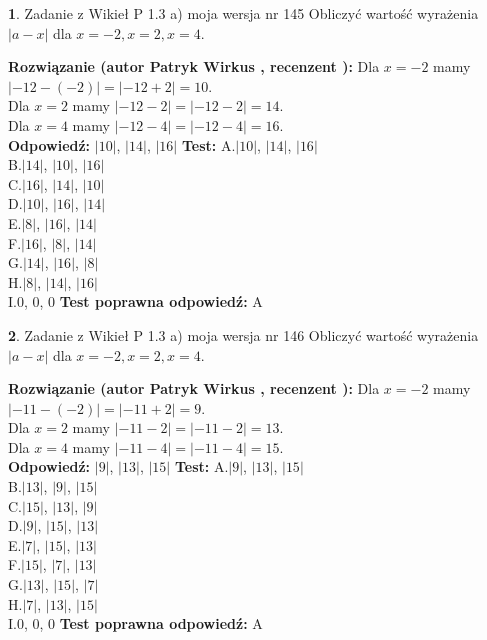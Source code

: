 \documentclass[12pt, a4paper]{article}
\theoremstyle{definition} %
\newtheorem{zad}{}
\newcommand{\zadStart}[1]{\begin{zad}#1\newline}
\newcommand{\zadStop}{\end{zad}}
\newcommand{\rozwStart}[2]{\noindent \textbf{Rozwiązanie (autor #1 , recenzent #2): }\newline}
\newcommand{\rozwStop}{\newline}
\newcommand{\odpStart}{\noindent \textbf{Odpowiedź:}\newline}
\newcommand{\odpStop}{\newline}
\newcommand{\testStart}{\noindent \textbf{Test:}\newline}
\newcommand{\testStop}{\newline}
\newcommand{\kluczStart}{\noindent \textbf{Test poprawna odpowiedź:}\newline}
\newcommand{\kluczStop}{\newline}
\begin{document}
\zadStart{Zadanie z Wikieł P 1.3 a) moja wersja nr 145}
Obliczyć wartość wyrażenia $|a - x|$ dla $x=-2,x=2,x=4$.
\zadStop
\rozwStart{Patryk Wirkus}{}
Dla $x = -2$ mamy $|-12 - (-2)| = |-12 + 2| = 10$.\\
Dla $x = 2$ mamy $|-12 - 2| = |-12 - 2| = 14$.\\
Dla $x = 4$ mamy $|-12 - 4| = |-12 - 4| = 16$.\\
\rozwStop
\odpStart
$|10|$, $|14|$, $|16|$
\odpStop
\testStart
A.$|10|$, $|14|$, $|16|$\\
B.$|14|$, $|10|$, $|16|$\\
C.$|16|$, $|14|$, $|10|$\\
D.$|10|$, $|16|$, $|14|$\\
E.$|8|$, $|16|$, $|14|$\\
F.$|16|$, $|8|$, $|14|$\\
G.$|14|$, $|16|$, $|8|$\\
H.$|8|$, $|14|$, $|16|$\\
I.$0$, $0$, $0$
\testStop
\kluczStart
A
\kluczStop



\zadStart{Zadanie z Wikieł P 1.3 a) moja wersja nr 146}
Obliczyć wartość wyrażenia $|a - x|$ dla $x=-2,x=2,x=4$.
\zadStop
\rozwStart{Patryk Wirkus}{}
Dla $x = -2$ mamy $|-11 - (-2)| = |-11 + 2| = 9$.\\
Dla $x = 2$ mamy $|-11 - 2| = |-11 - 2| = 13$.\\
Dla $x = 4$ mamy $|-11 - 4| = |-11 - 4| = 15$.\\
\rozwStop
\odpStart
$|9|$, $|13|$, $|15|$
\odpStop
\testStart
A.$|9|$, $|13|$, $|15|$\\
B.$|13|$, $|9|$, $|15|$\\
C.$|15|$, $|13|$, $|9|$\\
D.$|9|$, $|15|$, $|13|$\\
E.$|7|$, $|15|$, $|13|$\\
F.$|15|$, $|7|$, $|13|$\\
G.$|13|$, $|15|$, $|7|$\\
H.$|7|$, $|13|$, $|15|$\\
I.$0$, $0$, $0$
\testStop
\kluczStart
A
\kluczStop
\end{document}
